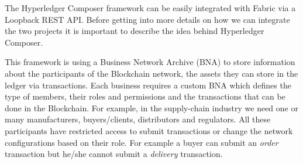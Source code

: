The Hyperledger Composer framework can be easily integrated with Fabric via a Loopback REST API. Before getting into more details on how we can integrate the two projects it is important to describe the idea behind Hyperledger Composer.

This framework is using a Business Network Archive (BNA) to store information about the participants of the Blockchain network, the assets they can store in the ledger via transactions. Each business requires a custom BNA which defines the type of members, their roles and permissions and the transactions that can be done in the Blockchain. For example, in the supply-chain industry we need one or many manufacturers, buyers/clients, distributors and regulators. All these participants have restricted access to submit transactions or change the network configurations based on their role. For example a buyer can submit an \emph{order} transaction but he/she cannot submit a \emph{delivery} transaction.

